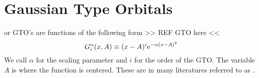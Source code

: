 \section{Gaussian Type Orbitals}
     or GTO's are functions of the following form
    >> REF GTO here <<
        \begin{equation}
            G^{\alpha}_{i}(x,A) \equiv (x-A)^i\mathrm{e}^{-\alpha (x-A)^2}
            \label{eq:GTOdef1d}
        \end{equation}
    We call $\alpha$ for the scaling parameter and $i$ for the order of the
    GTO. The variable $A$ is where the function is centered. These are in many
    literatures referred to as .
